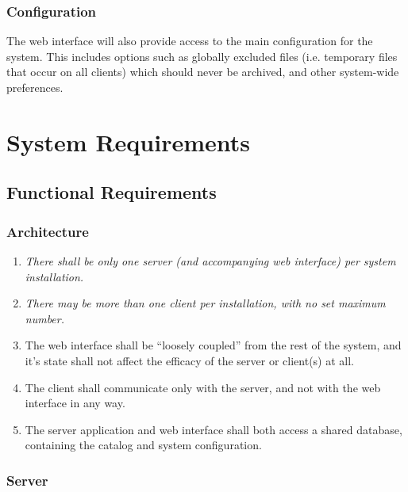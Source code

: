 \subsubsection{Configuration}

The web interface will also provide access to the main configuration for the
system. This includes options such as globally excluded files (i.e. temporary
files that occur on all clients) which should never be archived, and other
system-wide preferences.

\section{System Requirements}

\subsection{Functional Requirements}

\subsubsection{Architecture}

\begin{enumerate}
    \item \emph{There shall be only one server (and accompanying web interface)
        per system installation.}
    \item \emph{There may be more than one client per installation, with no set
        maximum number.}
    \item The web interface shall be ``loosely coupled'' from the rest of the
        system, and it's state shall not affect the efficacy of the server or
        client(s) at all.
    \item The client shall communicate only with the server, and not with the
        web interface in any way.
    \item The server application and web interface shall both access a shared
        database, containing the catalog and system configuration.
\end{enumerate}

\subsubsection{Server}

